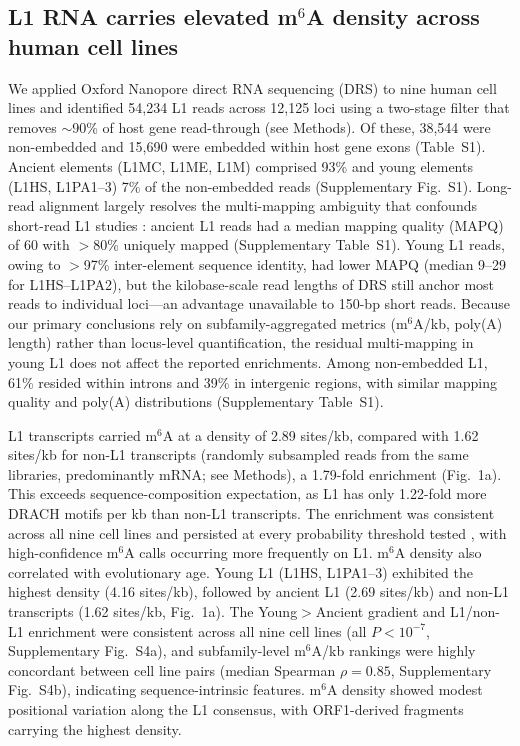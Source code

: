 \documentclass[11pt]{article}
\newcommand{\msix}{m$^6$A}
\begin{document}
\subsection{L1 RNA carries elevated \msix{} density across human cell lines}

We applied Oxford Nanopore direct RNA sequencing (DRS) to nine human cell
lines and identified 54,234 L1 reads across 12,125 loci using a
two-stage filter that removes $\sim$90\% of host gene read-through (see
Methods). Of these, 38,544 were non-embedded and 15,690 were embedded
within host gene exons (Table~S1). Ancient elements (L1MC,
L1ME, L1M) comprised 93\% and young elements (L1HS, L1PA1--3) 7\% of the
non-embedded reads (Supplementary Fig.~S1). Long-read alignment largely
resolves the multi-mapping ambiguity that confounds short-read L1
studies \citep{Lanciano2020}: ancient L1 reads had a median mapping
quality (MAPQ) of 60 with $>$80\% uniquely mapped (Supplementary
Table~S1). Young L1 reads, owing to $>$97\% inter-element sequence
identity, had lower MAPQ (median 9--29 for L1HS--L1PA2), but the
kilobase-scale read lengths of DRS still anchor most reads to individual
loci---an advantage unavailable to 150-bp short reads. Because our
primary conclusions rely on subfamily-aggregated metrics (\msix{}/kb,
poly(A) length) rather than locus-level quantification, the residual
multi-mapping in young L1 does not affect the reported enrichments.
Among non-embedded L1, 61\% resided within introns and 39\% in
intergenic regions, with similar mapping quality and poly(A)
distributions (Supplementary Table~S1).

L1 transcripts carried \msix{} at a density of 2.89 sites/kb, compared
with 1.62 sites/kb for non-L1 transcripts (randomly subsampled reads
from the same libraries, predominantly mRNA; see Methods),
a 1.79-fold enrichment (Fig.~1a). This exceeds sequence-composition
expectation, as L1 has only 1.22-fold more DRACH motifs per kb than
non-L1 transcripts. The enrichment was consistent across
all nine cell lines and persisted at every probability threshold tested
, with high-confidence \msix{} calls occurring
more frequently on L1. \msix{} density also correlated with evolutionary age.
Young L1 (L1HS, L1PA1--3) exhibited the highest density (4.16 sites/kb),
followed by ancient L1 (2.69 sites/kb) and non-L1 transcripts (1.62
sites/kb, Fig.~1a). The Young${>}$Ancient
gradient and L1/non-L1 enrichment were consistent across all nine cell
lines (all $P < 10^{-7}$, Supplementary Fig.~S4a), and subfamily-level
\msix{}/kb rankings were highly concordant between cell line pairs
(median Spearman $\rho = 0.85$, Supplementary Fig.~S4b), indicating
sequence-intrinsic features. \msix{} density showed modest positional
variation along the L1 consensus, with ORF1-derived fragments carrying
the highest density.
\end{document}
